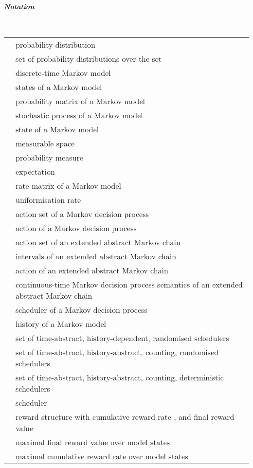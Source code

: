 \documentclass[10pt,twocolumn]{article}
\begin{document}
\paragraph*{\itshape Notation}\ \\
\begin{supertabular}{p{1.6cm}p{5.7cm}}
   & probability distribution\\
   & set of probability distributions over the set \\
   & discrete-time Markov model\\
   & states of a Markov model\\
   & probability matrix of a Markov model\\
   & stochastic process of a Markov model\\
   & state of a Markov model\\
   & measurable space\\
   & probability measure\\
   & expectation\\
   & rate matrix of a Markov model\\
   & uniformisation rate\\
   & action set of a Markov decision process\\
   & action of a Markov decision process\\
   & action set of an extended abstract Markov chain\\
   & intervals of an extended abstract Markov chain\\
   & action of an extended abstract Markov chain\\
   & continuous-time Markov decision process semantics of an extended abstract Markov chain\\
   & scheduler of a Markov decision process\\
   & history of a Markov model\\
   & set of time-abstract, history-dependent, randomised schedulers\\
   & set of time-abstract, history-abstract, counting, randomised schedulers\\
   & set of time-abstract, history-abstract, counting, deterministic schedulers\\
   & scheduler\\
   & reward structure with cumulative reward rate , and final reward value \\
   & maximal final reward value over model states\\
   & maximal cumulative reward rate over model states\\

\end{supertabular}
\end{document}
